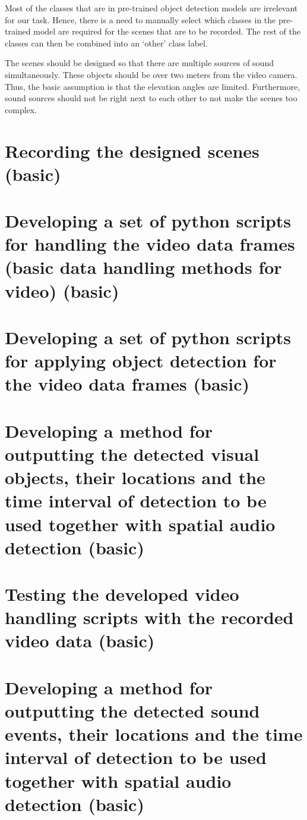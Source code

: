 Most of the classes that are in pre-trained object detection models are irrelevant for our task. Hence, there is a
need to manually select which classes in the pre-trained model are required for the scenes that are to be 
recorded. The rest of the classes can then be combined into an `other' class label.

The scenes should be designed so that there are multiple sources of sound simultaneously. These objects should
be over two meters from the video camera. Thus, the basic assumption is that the elevation angles are limited.
Furthermore, sound sources should not be right next to each other to not make the scenes too complex.

\section{Recording the designed scenes (basic)}

\section{Developing a set of python scripts for handling the video data frames (basic data handling methods for video) (basic)}

\section{Developing a set of python scripts for applying object detection for the video data frames (basic)}

\section{Developing a method for outputting the detected visual objects, their locations and the time interval of detection to be used together with spatial audio detection (basic)}

\section{Testing the developed video handling scripts with the recorded video data (basic)}

\section{Developing a method for outputting the detected sound events, their locations and the time interval of detection to be used together with spatial audio detection (basic)}

